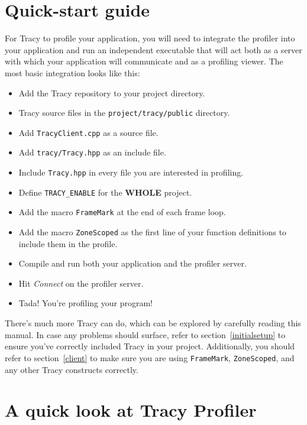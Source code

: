 \documentclass[hidelinks,titlepage,a4paper,twoside]{article}
\begin{document}
\section*{Quick-start guide}

For Tracy to profile your application, you will need to integrate the profiler into your application and run an independent executable that will act both as a server with which your application will communicate and as a profiling viewer. The most basic integration looks like this:

\begin{itemize}
\item Add the Tracy repository to your project directory.
\item Tracy source files in the \texttt{project/tracy/public} directory.
\item Add \texttt{TracyClient.cpp} as a source file.
\item Add \texttt{tracy/Tracy.hpp} as an include file.
\item Include \texttt{Tracy.hpp} in every file you are interested in profiling.
\item Define \texttt{TRACY\_ENABLE} for the \textbf{WHOLE} project.
\item Add the macro \texttt{FrameMark} at the end of each frame loop.
\item Add the macro \texttt{ZoneScoped} as the first line of your function definitions to include them in the profile.
\item Compile and run both your application and the profiler server.
\item Hit \emph{Connect} on the profiler server.
\item Tada! You're profiling your program!
\end{itemize}

There's much more Tracy can do, which can be explored by carefully reading this manual. In case any problems should surface, refer to section~\ref{initialsetup} to ensure you've correctly included Tracy in your project. Additionally, you should refer to section~\ref{client} to make sure you are using \texttt{FrameMark}, \texttt{ZoneScoped}, and any other Tracy constructs correctly.

\newpage

\tableofcontents

\newpage

\section{A quick look at Tracy Profiler}
\label{quicklook}
\end{document}

